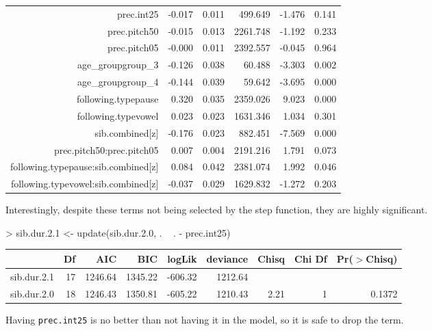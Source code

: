 \documentclass[a4paper]{article}
\begin{document}
{\begin{tabular}{rrrrrr}
$$  prec.int25 & -0.017 & 0.011 & 499.649 & -1.476 & 0.141 \\
  prec.pitch50 & -0.015 & 0.013 & 2261.748 & -1.192 & 0.233 \\
  prec.pitch05 & -0.000 & 0.011 & 2392.557 & -0.045 & 0.964 \\
  age\_groupgroup\_3 & -0.126 & 0.038 & 60.488 & -3.303 & 0.002 \\
  age\_groupgroup\_4 & -0.144 & 0.039 & 59.642 & -3.695 & 0.000 \\
  following.typepause & 0.320 & 0.035 & 2359.026 & 9.023 & 0.000 \\
  following.typevowel & 0.023 & 0.023 & 1631.346 & 1.034 & 0.301 \\
  sib.combined[z] & -0.176 & 0.023 & 882.451 & -7.569 & 0.000 \\
  prec.pitch50:prec.pitch05 & 0.007 & 0.004 & 2191.216 & 1.791 & 0.073 \\
  following.typepause:sib.combined[z] & 0.084 & 0.042 & 2381.074 & 1.992 & 0.046 \\
  following.typevowel:sib.combined[z] & -0.037 & 0.029 & 1629.832 & -1.272 & 0.203 \\
   \hline
\end{tabular}
}\endgroup\newline\newline\newline
Interestingly, despite these terms not being selected by the step
function, they are highly significant.

\begin{Schunk}
\begin{Sinput}
> sib.dur.2.1 <- update(sib.dur.2.0, . ~ . - prec.int25)
\end{Sinput}
\end{Schunk}

\begin{table}[ht]
\centering
\begin{tabular}{lrrrrrrrr}
  \hline
 & Df & AIC & BIC & logLik & deviance & Chisq & Chi Df & Pr($>$Chisq) \\
  \hline
sib.dur.2.1 & 17 & 1246.64 & 1345.22 & -606.32 & 1212.64 &  &  &  \\
  sib.dur.2.0 & 18 & 1246.43 & 1350.81 & -605.22 & 1210.43 & 2.21 & 1 & 0.1372 \\
   \hline
\end{tabular}
\end{table}
Having \texttt{prec.int25} is no better than not having it in the model, so
it is safe to drop the term.\newline
\end{document}
